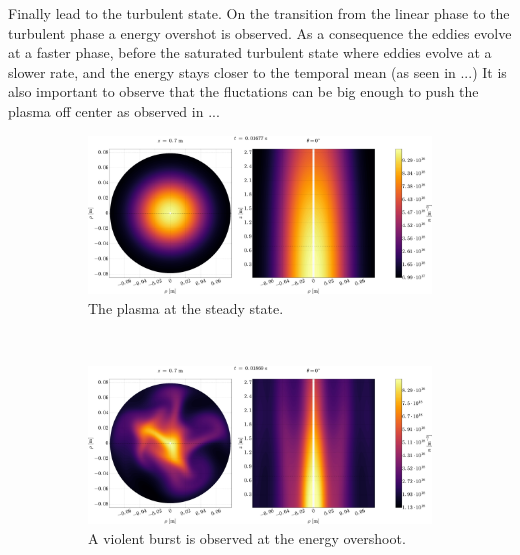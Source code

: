%
Finally lead to the turbulent state.
On the transition from the linear phase to the turbulent phase a energy overshot is observed.
As a consequence the eddies evolve at a faster phase, before the saturated turbulent state where eddies evolve at a slower rate, and the energy stays closer to the temporal mean (as seen in ...)
It is also important to observe that the fluctations can be big enough to push the plasma off center as observed in ...
%
\begin{figure}[htbp]
    \centering
    \begin{subfigure}[h]{1.00\textwidth}
        \centering
        \includegraphics[width=1.0\textwidth]{fig/results/2DTurbulence/steadyStateN}
        \caption{The plasma at the steady state.}
        \label{fig:2Dsteady}
    \end{subfigure}%
    \\
    \begin{subfigure}[h]{1.00\textwidth}
        \centering
        \includegraphics[width=1.0\textwidth]{fig/results/2DTurbulence/violentBurst}
        \caption{A violent burst is observed at the energy overshoot.}
        \label{fig:violentBurst}
    \end{subfigure}
    \\
    \begin{subfigure}[h]{1.00\textwidth}
        \centering

\end{subfigure}
\end{figure}
